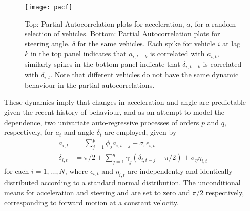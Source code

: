 \documentclass[12pt,a4paper]{article}\usepackage[]{graphicx}\usepackage[]{color}
\begin{document}
\begin{figure}
\centering
\texttt{[image: pacf]}
\caption{Top: Partial Autocorrelation plots for acceleration, $a$, for a random selection of vehicles. Bottom: Partial Autocorrelation plots for steering angle, $\delta$ for the same vehicles. Each spike for vehicle $i$ at lag $k$ in the top panel indicates that $a_{i, t-k}$ is correlated with $a_{i, t}$, similarly spikes in the bottom panel indicate that $\delta_{i, t-k}$ is correlated with $\delta_{i, t}$. Note that different vehicles do not have the same dynamic behaviour in the partial autocorrelations.}
\label{fig:pacf}
\end{figure}

These dynamics imply that changes in acceleration and angle are predictable given the recent history of behaviour, and as an attempt to model the dependence, two univariate auto-regressive processes of orders $p$ and $q$, respectively, for $a_t$ and angle  $\delta_t$ are employed, given by
\begin{align}
a_{i, t} &= \sum_{j = 1}^p \phi_{j} a_{i, t-j} + \sigma_{\epsilon} \epsilon_{i, t} \label{aAR} \\
\delta_{i, t} &= \pi/2 + \sum_{j = 1}^q \gamma_{j} (\delta_{i, t-j} - \pi/2) + \sigma_{\eta} \eta_{i, t} \label{dAR}
\end{align}
for each $i = 1, \dots, N$, where $\epsilon_{i, t}$ and $\eta_{i, t}$ are independently and identically distributed according to a standard normal distribution. The unconditional means for acceleration and steering and are set to zero and $\pi/2$ respectively, corresponding to forward motion at a constant velocity.
\\
\end{document}
